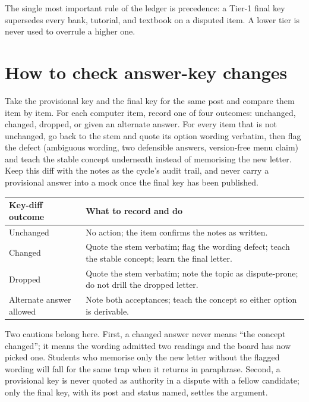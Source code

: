 \documentclass[11pt]{article}
\begin{document}
The single most important rule of the ledger is precedence: a Tier-1 final
key supersedes every bank, tutorial, and textbook on a disputed item. A lower
tier is never used to overrule a higher one.

\section{How to check answer-key changes}

Take the provisional key and the final key for the same post and compare them
item by item. For each computer item, record one of four outcomes: unchanged,
changed, dropped, or given an alternate answer. For every item that is not
unchanged, go back to the stem and quote its option wording verbatim, then
flag the defect (ambiguous wording, two defensible answers, version-free menu
claim) and teach the stable concept underneath instead of memorising the new
letter. Keep this diff with the notes as the cycle's audit trail, and never
carry a provisional answer into a mock once the final key has been published.

\begin{center}
\begin{tabular}{p{}p{}}
\toprule
\textbf{Key-diff outcome} & \textbf{What to record and do} \\
\midrule
Unchanged & No action; the item confirms the notes as written. \\
Changed & Quote the stem verbatim; flag the wording defect; teach the stable concept; learn the final letter. \\
Dropped & Quote the stem verbatim; note the topic as dispute-prone; do not drill the dropped letter. \\
Alternate answer allowed & Note both acceptances; teach the concept so either option is derivable. \\
\bottomrule
\end{tabular}
\end{center}

Two cautions belong here. First, a changed answer never means ``the concept
changed''; it means the wording admitted two readings and the board has now
picked one. Students who memorise only the new letter without the flagged
wording will fall for the same trap when it returns in paraphrase. Second, a
provisional key is never quoted as authority in a dispute with a fellow
candidate; only the final key, with its post and status named, settles the
argument.
\end{document}
